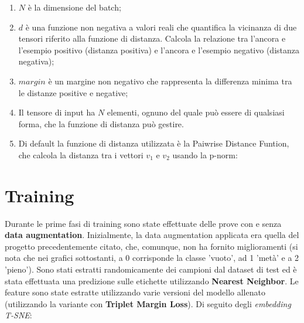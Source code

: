 \documentclass[11pt]{article}
\begin{document}
\begin{enumerate}
    \item $N$ è la dimensione del batch;
    \item {$d$ è una funzione non negativa a valori reali che quantifica la vicinanza di due tensori riferito
    alla funzione di distanza. Calcola la relazione tra l'ancora e l'esempio positivo
    (distanza positiva) e l'ancora e l'esempio negativo (distanza negativa);}
    \item {$margin$ 
        è un margine non negativo che rappresenta la differenza minima
        tra le distanze positive e negative;
    }
    \item Il tensore di input ha $N$ elementi, ognuno del quale può essere di qualsiasi forma, che la funzione di distanza può gestire.

    \item {
        Di default la funzione di distanza utilizzata è la Paiwrise Distance Funtion,
        che calcola la distanza tra i vettori $v_1$ e $v_2$ usando la p-norm:
    }

\end{enumerate}


\pagebreak
\section{Training}

Durante le prime fasi di training sono state effettuate delle prove con e senza \textbf{data augmentation}. Inizialmente, la data augmentation applicata
era quella del progetto precedentemente citato, che, comunque, non ha fornito miglioramenti (si nota che nei grafici sottostanti, a 0 corrisponde la classe 'vuoto',
ad 1 'metà' e a 2 'pieno'). Sono stati estratti randomicamente dei campioni dal dataset di test ed è stata effettuata una predizione
sulle etichette utilizzando \textbf{Nearest Neighbor}. Le feature sono state estratte utilizzando varie versioni del modello allenato (utilizzando la variante con \textbf{Triplet Margin Loss}). Di seguito degli \textit{embedding T-SNE}:
\end{document}
